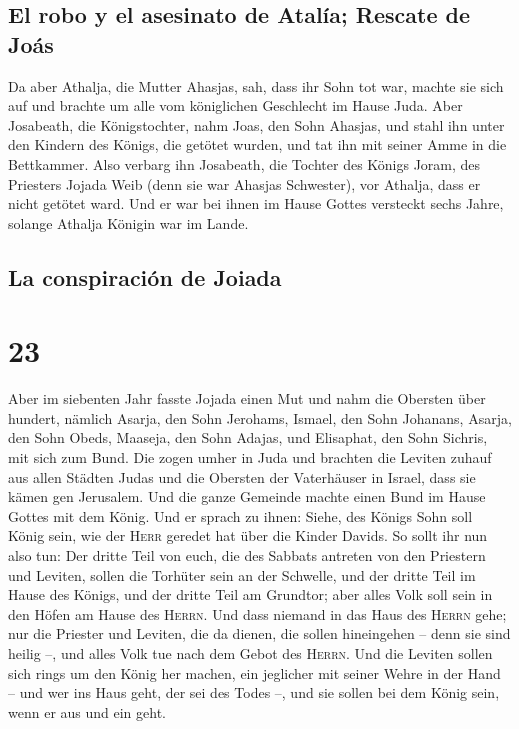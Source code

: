 \hypertarget{el-robo-y-el-asesinato-de-ataluxeda-rescate-de-jouxe1s}{%
\subsection{El robo y el asesinato de Atalía; Rescate de
Joás}\label{el-robo-y-el-asesinato-de-ataluxeda-rescate-de-jouxe1s}}

 Da aber Athalja, die Mutter Ahasjas, sah, dass ihr Sohn
tot war, machte sie sich auf und brachte um alle vom königlichen
Geschlecht im Hause Juda.  Aber Josabeath, die
Königstochter, nahm Joas, den Sohn Ahasjas, und stahl ihn unter den
Kindern des Königs, die getötet wurden, und tat ihn mit seiner Amme in
die Bettkammer. Also verbarg ihn Josabeath, die Tochter des Königs
Joram, des Priesters Jojada Weib (denn sie war Ahasjas Schwester), vor
Athalja, dass er nicht getötet ward.  Und er war bei
ihnen im Hause Gottes versteckt sechs Jahre, solange Athalja Königin war
im Lande.

\hypertarget{la-conspiraciuxf3n-de-joiada}{%
\subsection{La conspiración de
Joiada}\label{la-conspiraciuxf3n-de-joiada}}

\hypertarget{section-22}{%
\section{23}\label{section-22}}

 Aber im siebenten Jahr fasste Jojada einen Mut und nahm
die Obersten über hundert, nämlich Asarja, den Sohn Jerohams, Ismael,
den Sohn Johanans, Asarja, den Sohn Obeds, Maaseja, den Sohn Adajas, und
Elisaphat, den Sohn Sichris, mit sich zum Bund.  Die zogen
umher in Juda und brachten die Leviten zuhauf aus allen Städten Judas
und die Obersten der Vaterhäuser in Israel, dass sie kämen gen
Jerusalem.  Und die ganze Gemeinde machte einen Bund im
Hause Gottes mit dem König. Und er sprach zu ihnen: Siehe, des Königs
Sohn soll König sein, wie der \textsc{Herr} geredet hat über die Kinder
Davids.  So sollt ihr nun also tun: Der dritte Teil von
euch, die des Sabbats antreten von den Priestern und Leviten, sollen die
Torhüter sein an der Schwelle,  und der dritte Teil im
Hause des Königs, und der dritte Teil am Grundtor; aber alles Volk soll
sein in den Höfen am Hause des \textsc{Herrn}.  Und dass
niemand in das Haus des \textsc{Herrn} gehe; nur die Priester und
Leviten, die da dienen, die sollen hineingehen -- denn sie sind heilig
--, und alles Volk tue nach dem Gebot des \textsc{Herrn}. 
Und die Leviten sollen sich rings um den König her machen, ein jeglicher
mit seiner Wehre in der Hand -- und wer ins Haus geht, der sei des Todes
--, und sie sollen bei dem König sein, wenn er aus und ein geht.

